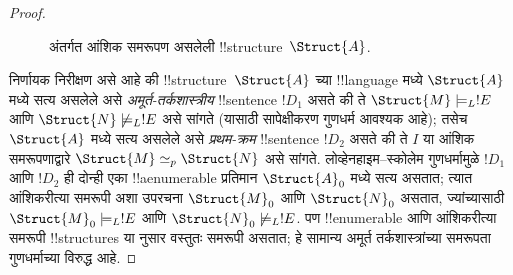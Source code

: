 \documentclass[../../../include/open-logic-section]{subfiles}
\begin{document}
\begin{proof}
\begin{figure}[h]
  \centering
  \caption{अंतर्गत आंशिक समरूपण असलेली !!{structure}~$\Struct{A}$.}
\end{figure}

निर्णायक निरीक्षण असे आहे की !!{structure}~$\Struct{A}$ च्या
!!{language} मध्ये $\Struct{A}$ मध्ये सत्य असलेले असे
\emph{अमूर्त-तर्कशास्त्रीय} !!{sentence} $!D_1$ असते की ते
$\Struct{M} \models_L !E$ आणि $\Struct{N} \not\models_L !E$ असे
सांगते (यासाठी सापेक्षीकरण गुणधर्म आवश्यक आहे); तसेच $\Struct{A}$ मध्ये
सत्य असलेले असे \emph{प्रथम-क्रम} !!{sentence} $!D_2$ असते की ते
$I$ या आंशिक समरूपणाद्वारे $\Struct{M} \simeq_p \Struct{N}$ असे
सांगते. लोव्हेनहाइम--स्कोलेम गुणधर्मामुळे $!D_1$ आणि $!D_2$ ही दोन्ही
एका !!a{enumerable} प्रतिमान $\Struct{A}_0$ मध्ये सत्य असतात; त्यात
आंशिकरीत्या समरूपी अशा उपरचना $\Struct{M}_0$ आणि $\Struct{N}_0$ असतात,
ज्यांच्यासाठी $\Struct{M}_0 \models_L !E$ आणि $\Struct{N}_0
\not\models_L !E$. पण !!{enumerable} आणि आंशिकरीत्या समरूपी
!!{structure}s या  नुसार वस्तुतः समरूपी
असतात; हे सामान्य अमूर्त तर्कशास्त्रांच्या समरूपता गुणधर्माच्या विरुद्ध
आहे.
\end{proof}
\end{document}
